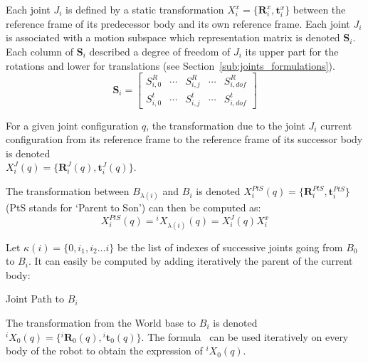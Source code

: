 Each joint $J_i$ is defined by a static transformation $X^x_i = \{\mathbf{R}^x_i, \mathbf{t}^x_i\}$ between the reference frame of its predecessor body and its own reference frame.
Each joint $J_i$ is associated with a motion subspace which representation matrix is denoted $\mathbf{S}_i$.
Each column of $\mathbf{S}_i$ described a degree of freedom of $J_i$ its upper part for the rotations and lower for translations (see Section~\ref{sub:joints_formulations}).
\begin{equation}
  \mathbf{S}_i =
  \begin{bmatrix}
    S^R_{i,0} & \cdots &
    S^R_{i,j} & \cdots &
    S^R_{i,dof} \\
    S^t_{i,0} & \cdots &
    S^t_{i,j} & \cdots &
    S^t_{i,dof}
  \end{bmatrix}
\end{equation}

For a given joint configuration $q$, the transformation due to the joint $J_i$ current configuration from its reference frame to the reference frame of its successor body is denoted \\$X^J_i (q) = \{\mathbf{R}^J_i (q), \mathbf{t}^J_i (q)\}$.

The transformation between $B_{\lambda(i)}$ and $B_i$ is denoted $X^{PtS}_i (q) = \{\mathbf{R}^{PtS}_i, \mathbf{t}^{PtS}_i\}$ (PtS stands for `Parent to Son') can then be computed as:
\begin{equation}
  {X}^{PtS}_i (q) = {}^{i}X_{\lambda (i)} (q) = X^J_i (q) X^x_i
  \label{eq:PtS}
\end{equation}

Let $\kappa (i) =\{0, i_1, i_2 \ldots i\}$ be the list of indexes of successive joints going from $B_0$ to $B_i$.
It can easily be computed by adding iteratively the parent of the current body:

\begin{algorithm}
  \caption{Joint Path to $B_i$}
\label{alg:JP}
\begin{algorithmic}
  \EndWhile{}
\end{algorithmic}
\end{algorithm}

The transformation from the World base to $B_i$ is denoted \\ ${}^i X_0 (q) = \{{}^i \mathbf{R}_0 (q), {}^i \mathbf{t}_0 (q)\}$.
The formula~ can be used iteratively on every body of the robot to obtain the expression of ${}^i X_0 (q)$.

